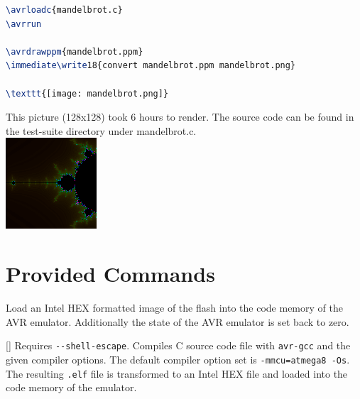 \documentclass{article}
\begin{document}
\begin{tcolorbox}
\begin{lstlisting}[language=TeX]
\avrloadc{mandelbrot.c}
\avrrun

\avrdrawppm{mandelbrot.ppm}
\immediate\write18{convert mandelbrot.ppm mandelbrot.png}
  
\texttt{[image: mandelbrot.png]}
\end{lstlisting}
  \tcblower
  This picture (128x128) took 6 hours to render. The source code can be found in the test-suite
  directory under mandelbrot.c.\\

  \includegraphics[width=\linewidth]{../imgs/mandelbrot-128x128}
\end{tcolorbox}

\section{Provided Commands}

Load an Intel HEX formatted image of the flash into the code memory of the AVR
emulator. Additionally the state of the AVR emulator is set back to zero.

\DescribeMacro{\avrloadc}[]{}
Requires \verb|--shell-escape|. Compiles C source code file with \verb|avr-gcc| and the given
compiler options. The default compiler option set is \verb|-mmcu=atmega8 -Os|. The resulting
\texttt{.elf} file is transformed to an Intel HEX file and loaded into the code memory of the
emulator.
\end{document}
